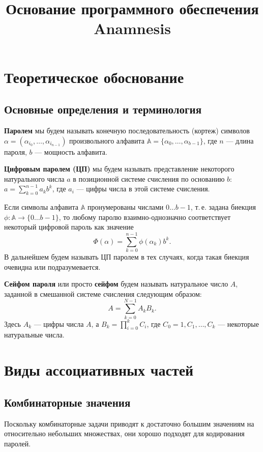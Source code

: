 \documentclass[12pt,a4paper,oneside]{article}
\title{Основание программного обеспечения \textbf{Anamnesis}}
\begin{document}
\maketitle

\tableofcontents
\newpage


\section{Теоретическое обоснование}

\subsection{Основные определения и терминология}

\textbf{Паролем} мы будем называть конечную последовательность (кортеж) символов $\alpha=(\alpha_{i_0},\ldots,\alpha_{i_{n-1}})$ произвольного алфавита $\mathbb{A}=\{\alpha_0, \ldots, \alpha_{b-1}\}$, где $n$ --- длина пароля, $b$ --- мощность алфавита.

\textbf{Цифровым паролем (ЦП)} мы будем называть представление некоторого натурального числа $a$ в позиционной системе счисления по основанию $b$: $a=\sum^{n-1}_{k=0}a_kb^k$, где $a_i$ --- цифры числа в этой системе счисления.

Если символы алфавита $\mathbb{A}$ пронумерованы числами $0\ldots b-1$, т.\,е. задана биекция $\phi:\mathbb{A}\rightarrow\{0\ldots b-1\}$, то любому паролю взаимно-однозначно соответствует некоторый цифровой пароль как значение
$$
\Phi(\alpha)=\sum^{n-1}_{k=0}\phi(\alpha_k)b^k.
$$
В дальнейшем будем называть ЦП паролем в тех случаях, когда такая биекция очевидна или подразумевается.

\textbf{Сейфом пароля} или просто \textbf{сейфом} будем называть натуральное число $A$, заданной в смешанной системе счисления следующим образом:
$$
A=\sum^{N-1}_{k=0}A_kB_k.
$$
Здесь $A_k$ --- цифры числа $A$, а $B_k=\prod^{k}_{i=0}C_i$, где $C_0=1, C_1,\ldots,C_k$ --- некоторые натуральные числа.

\section{Виды ассоциативных частей}

\subsection{Комбинаторные значения}
Поскольку комбинаторные задачи приводят к достаточно большим значениям на относительно небольших множествах, они хорошо подходят для кодирования паролей.
\end{document}
